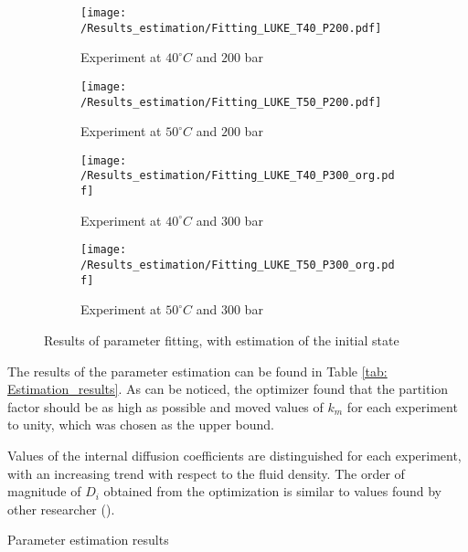 \documentclass[../Article_Model_Parameters.tex]{subfiles}
\begin{document}
	\begin{figure*}[!h]
		\centering
		\begin{subfigure}[b]{0.8\textwidth}
			\centering
			\texttt{[image: /Results\_estimation/Fitting\_LUKE\_T40\_P200.pdf]}
			\caption{Experiment at $40^\circ C$ and $200$ bar}
		\end{subfigure}
		\hfill
		\begin{subfigure}[b]{0.8\textwidth}
			\centering
			\texttt{[image: /Results\_estimation/Fitting\_LUKE\_T50\_P200.pdf]}
			\caption{Experiment at $50^\circ C$ and $200$ bar}
		\end{subfigure}
		\hfill
		\begin{subfigure}[b]{0.8\textwidth}
			\centering
			\texttt{[image: /Results\_estimation/Fitting\_LUKE\_T40\_P300\_org.pdf]}
			\caption{Experiment at $40^\circ C$ and $300$ bar}
		\end{subfigure}
		\hfill
		\begin{subfigure}[b]{0.8\textwidth}
			\centering
			\texttt{[image: /Results\_estimation/Fitting\_LUKE\_T50\_P300\_org.pdf]}
			\caption{Experiment at $50^\circ C$ and $300$ bar}
		\end{subfigure}
		\caption{Results of parameter fitting, with estimation of the initial state}
		\label{fig: estimation_results}
	\end{figure*}

	The results of the parameter estimation can be found in Table \ref{tab: Estimation_results}. As can be noticed, the optimizer found that the partition factor should be as high as possible and moved values of $k_m$ for each experiment to unity, which was chosen as the upper bound.
	
	Values of the internal diffusion coefficients are distinguished for each experiment, with an increasing trend with respect to the fluid density. The order of magnitude of $D_i$ obtained from the optimization is similar to values found by other researcher ().
	
	\begin{table}[!h]
		\centering
		\caption{Parameter estimation results}
		\label{tab: Estimation_results}
	\end{table}
\end{document}

